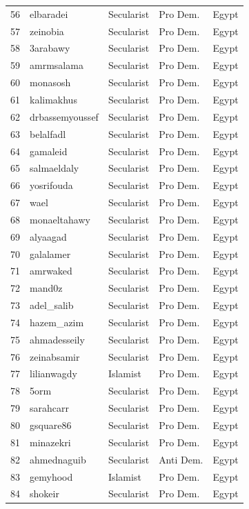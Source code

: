 \documentclass[12pt]{article}
\begin{document}
\begin{longtable}{rllll}
	56 & elbaradei & Secularist & Pro Dem. & Egypt \\ 
	57 & zeinobia & Secularist & Pro Dem. & Egypt \\ 
	58 & 3arabawy & Secularist & Pro Dem. & Egypt \\ 
	59 & amrmsalama & Secularist & Pro Dem. & Egypt \\ 
	60 & monasosh & Secularist & Pro Dem. & Egypt \\ 
	61 & kalimakhus & Secularist & Pro Dem. & Egypt \\ 
	62 & drbassemyoussef & Secularist & Pro Dem. & Egypt \\ 
	63 & belalfadl & Secularist & Pro Dem. & Egypt \\ 
	64 & gamaleid & Secularist & Pro Dem. & Egypt \\ 
	65 & salmaeldaly & Secularist & Pro Dem. & Egypt \\ 
	66 & yosrifouda & Secularist & Pro Dem. & Egypt \\ 
	67 & wael & Secularist & Pro Dem. & Egypt \\ 
	68 & monaeltahawy & Secularist & Pro Dem. & Egypt \\ 
	69 & alyaagad & Secularist & Pro Dem. & Egypt \\ 
	70 & galalamer & Secularist & Pro Dem. & Egypt \\ 
	71 & amrwaked & Secularist & Pro Dem. & Egypt \\ 
	72 & mand0z & Secularist & Pro Dem. & Egypt \\ 
	73 & adel\_salib & Secularist & Pro Dem. & Egypt \\ 
	74 & hazem\_azim & Secularist & Pro Dem. & Egypt \\ 
	75 & ahmadesseily & Secularist & Pro Dem. & Egypt \\ 
	76 & zeinabsamir & Secularist & Pro Dem. & Egypt \\ 
	77 & lilianwagdy & Islamist & Pro Dem. & Egypt \\ 
	78 & 5orm & Secularist & Pro Dem. & Egypt \\ 
	79 & sarahcarr & Secularist & Pro Dem. & Egypt \\ 
	80 & gsquare86 & Secularist & Pro Dem. & Egypt \\ 
	81 & minazekri & Secularist & Pro Dem. & Egypt \\ 
	82 & ahmednaguib & Secularist & Anti Dem. & Egypt \\ 
	83 & gemyhood & Islamist & Pro Dem. & Egypt \\ 
	84 & shokeir & Secularist & Pro Dem. & Egypt \\ 

\end{longtable}
\end{document}
